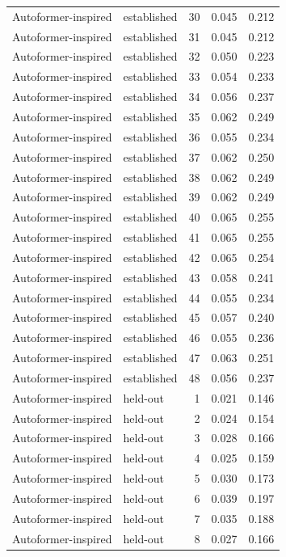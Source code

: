 \begin{tabular}{llrrr}
Autoformer-inspired & established & 30 & 0.045 & 0.212 \\
Autoformer-inspired & established & 31 & 0.045 & 0.212 \\
Autoformer-inspired & established & 32 & 0.050 & 0.223 \\
Autoformer-inspired & established & 33 & 0.054 & 0.233 \\
Autoformer-inspired & established & 34 & 0.056 & 0.237 \\
Autoformer-inspired & established & 35 & 0.062 & 0.249 \\
Autoformer-inspired & established & 36 & 0.055 & 0.234 \\
Autoformer-inspired & established & 37 & 0.062 & 0.250 \\
Autoformer-inspired & established & 38 & 0.062 & 0.249 \\
Autoformer-inspired & established & 39 & 0.062 & 0.249 \\
Autoformer-inspired & established & 40 & 0.065 & 0.255 \\
Autoformer-inspired & established & 41 & 0.065 & 0.255 \\
Autoformer-inspired & established & 42 & 0.065 & 0.254 \\
Autoformer-inspired & established & 43 & 0.058 & 0.241 \\
Autoformer-inspired & established & 44 & 0.055 & 0.234 \\
Autoformer-inspired & established & 45 & 0.057 & 0.240 \\
Autoformer-inspired & established & 46 & 0.055 & 0.236 \\
Autoformer-inspired & established & 47 & 0.063 & 0.251 \\
Autoformer-inspired & established & 48 & 0.056 & 0.237 \\
Autoformer-inspired & held-out & 1 & 0.021 & 0.146 \\
Autoformer-inspired & held-out & 2 & 0.024 & 0.154 \\
Autoformer-inspired & held-out & 3 & 0.028 & 0.166 \\
Autoformer-inspired & held-out & 4 & 0.025 & 0.159 \\
Autoformer-inspired & held-out & 5 & 0.030 & 0.173 \\
Autoformer-inspired & held-out & 6 & 0.039 & 0.197 \\
Autoformer-inspired & held-out & 7 & 0.035 & 0.188 \\
Autoformer-inspired & held-out & 8 & 0.027 & 0.166 \\

\end{tabular}
